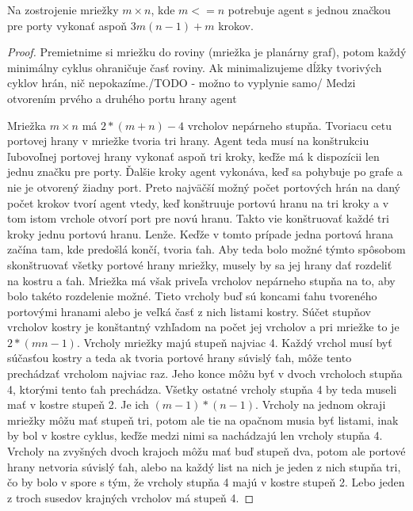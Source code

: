 \begin{lem}
Na zostrojenie mriežky $m \times n$, kde $m <=  n$ potrebuje agent s jednou
značkou pre porty vykonať aspoň $3m(n - 1) + m$ krokov.
\end{lem}
\begin{proof}
Premietnime si mriežku do roviny (mriežka je planárny graf), 
potom každý minimálny cyklus ohraničuje časť roviny. 
Ak minimalizujeme dĺžky tvorivých cyklov
hrán, nič nepokazíme./TODO - možno to vyplynie samo/
Medzi otvorením prvého a druhého portu hrany agent 





\iffalse
Mriežka $m \times n$ má $2*(m+n) - 4$ vrcholov nepárneho stupňa. Tvoriacu
cetu portovej hrany v mriežke tvoria tri hrany. Agent teda musí na
konštrukciu ľubovoľnej portovej hrany vykonať aspoň tri kroky, keďže má k
dispozícii len jednu značku pre porty.
Ďalšie kroky agent vykonáva, keď sa pohybuje po grafe a nie je otvorený
žiadny port. Preto najväčší možný počet portových hrán na daný počet krokov 
tvorí agent vtedy, keď konštruuje portovú hranu na tri kroky a v tom istom
vrchole otvorí port pre novú hranu. Takto vie konštruovať každé tri kroky
jednu portovú hranu. Lenže. Keďže v tomto prípade jedna portová hrana začína
tam, kde predošlá končí, tvoria ťah. Aby teda bolo možné týmto spôsobom
skonštruovať všetky portové hrany mriežky, musely by sa jej hrany dať 
rozdeliť na kostru a ťah. Mriežka má však priveľa vrcholov nepárneho stupňa
na to, aby bolo takéto rozdelenie možné.
Tieto vrcholy buď sú koncami ťahu tvoreného portovými hranami alebo je veľká
časť z nich 
listami kostry. Súčet stupňov vrcholov kostry je konštantný vzhľadom na
počet jej vrcholov a pri mriežke to je $2 * (mn - 1)$. Vrcholy mriežky majú
stupeň najviac 4. Každý vrchol musí byť súčasťou kostry a teda ak tvoria
portové hrany súvislý ťah, môže tento prechádzať vrcholom najviac raz. Jeho
konce môžu byť v dvoch vrcholoch stupňa 4, ktorými tento ťah prechádza.
Všetky ostatné vrcholy stupňa 4 by teda museli mať v kostre stupeň 2. Je ich $(m -
1) * (n -1)$. Vrcholy na jednom okraji mriežky môžu mať stupeň tri, potom
ale tie na opačnom musia byť listami, inak by bol v kostre cyklus, keďže
medzi nimi sa nachádzajú len vrcholy stupňa 4. Vrcholy na zvyšných dvoch
krajoch môžu mať buď stupeň dva, potom ale portové hrany netvoria súvislý
ťah, alebo na každý list na nich je jeden z nich stupňa tri, čo by bolo v
spore s tým, že vrcholy stupňa 4 majú v kostre stupeň 2. Lebo jeden z troch
susedov krajných vrcholov má stupeň 4.


\end{proof}
